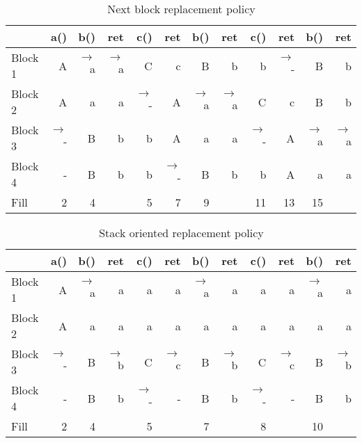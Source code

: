 \begin{table}
    \centering
\begin{tt}
    \begin{tabular}{lrrrrrrrrrrr}
    \toprule

                &a()    &b()    &ret    &c()    &ret    &b()    &ret    &c()    &ret    &b()    &ret    \\
    \midrule
    \rm{Block 1}&A      &$\to$a &$\to$a &C      &c      &B      &b      &b      &$\to$- &B      &b      \\
    \rm{Block 2}&A      &a      &a      &$\to$- &A      &$\to$a &$\to$a &C      &c      &B      &b      \\
    \rm{Block 3}&$\to$- &B      &b      &b      &A      &a      &a      &$\to$- &A      &$\to$a &$\to$a \\
    \rm{Block 4}&-      &B      &b      &b      &$\to$- &B      &b      &b      &A      &a      &a      \\
    \midrule
    \rm{Fill}      &2   &4      &       &5      &7      &9      &       &11     &13     &15     &       \\
    \bottomrule

    \end{tabular}
\end{tt}
    \caption{Next block replacement policy}
    \label{tab_cache_replace_next}
\end{table}

\begin{table}
    \centering
\begin{tt}
    \begin{tabular}{lrrrrrrrrrrr}
    \toprule

                &a()    &b()    &ret    &c()    &ret    &b()    &ret    &c()    &ret    &b()    &ret    \\
    \midrule
    \rm{Block 1}&A      &$\to$a &a      &a      &a      &$\to$a &a      &a      &a      &$\to$a &a      \\
    \rm{Block 2}&A      &a      &a      &a      &a      &a      &a      &a      &a      &a      &a      \\
    \rm{Block 3}&$\to$- &B      &$\to$b &C      &$\to$c &B      &$\to$b &C      &$\to$c &B      &$\to$b \\
    \rm{Block 4}&-      &B      &b      &$\to$- &-      &B      &b      &$\to$- &-      &B      &b      \\
    \midrule
    \rm{Fill}      &2   &4      &       &5      &       &7      &       &8      &       &10     &       \\
    \bottomrule

    \end{tabular}
\end{tt}
    \caption{Stack oriented replacement policy}
    \label{tab_cache_replace_stack}
\end{table}

